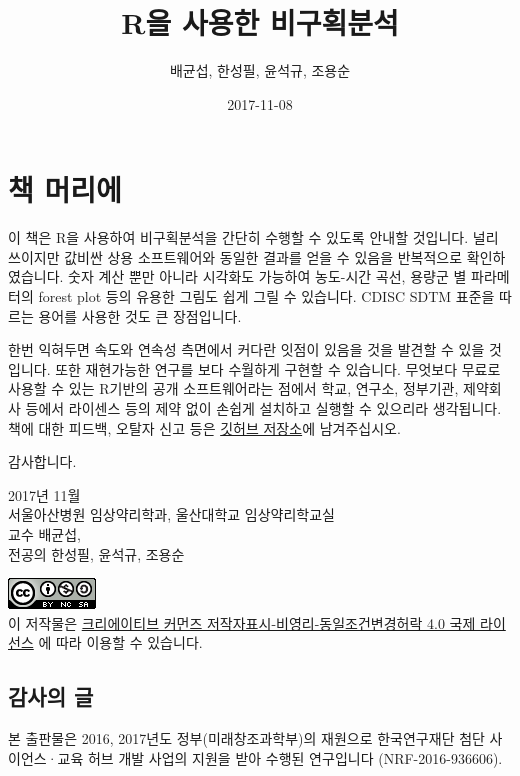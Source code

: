 \documentclass[12pt,]{krantz}
\title{R을 사용한 비구획분석}
\author{배균섭, 한성필, 윤석규, 조용순}
\date{2017-11-08}
\theoremstyle{definition}
\theoremstyle{definition}
\theoremstyle{definition}
\theoremstyle{remark}
\begin{document}
\maketitle

{
\hypersetup{linkcolor=black}
\setcounter{tocdepth}{2}
\tableofcontents
}
\chapter*{책 머리에}\label{-}


\href{https://github.com/asancpt/book-ncar}{}

이 책은 R을 사용하여 비구획분석을 간단히 수행할 수 있도록 안내할
것입니다. 널리 쓰이지만 값비싼 상용 소프트웨어와 동일한 결과를 얻을 수
있음을 반복적으로 확인하였습니다. 숫자 계산 뿐만 아니라 시각화도
가능하여 농도-시간 곡선, 용량군 별 파라메터의 forest plot 등의 유용한
그림도 쉽게 그릴 수 있습니다. CDISC SDTM 표준을 따르는 용어를 사용한
것도 큰 장점입니다.

한번 익혀두면 속도와 연속성 측면에서 커다란 잇점이 있음을 것을 발견할 수
있을 것입니다. 또한 재현가능한 연구를 보다 수월하게 구현할 수 있습니다.
무엇보다 무료로 사용할 수 있는 R기반의 공개 소프트웨어라는 점에서 학교,
연구소, 정부기관, 제약회사 등에서 라이센스 등의 제약 없이 손쉽게
설치하고 실행할 수 있으리라 생각됩니다. 책에 대한 피드백, 오탈자 신고
등은 \href{https://github.com/asancpt/book-ncar/issues}{깃허브 저장소}에
남겨주십시오.

감사합니다.

2017년 11월\\
서울아산병원 임상약리학과, 울산대학교 임상약리학교실\\
교수 배균섭,\\
전공의 한성필, 윤석규, 조용순

\includegraphics{assets/cc.png}\\
이 저작물은
\href{http://creativecommons.org/licenses/by-nc-sa/4.0/}{크리에이티브
커먼즈 저작자표시-비영리-동일조건변경허락 4.0 국제 라이선스} 에 따라
이용할 수 있습니다.

\section*{감사의 글}\label{-}


본 출판물은 2016, 2017년도 정부(미래창조과학부)의 재원으로 한국연구재단
첨단 사이언스·교육 허브 개발 사업의 지원을 받아 수행된 연구입니다
(NRF-2016-936606).
\end{document}
